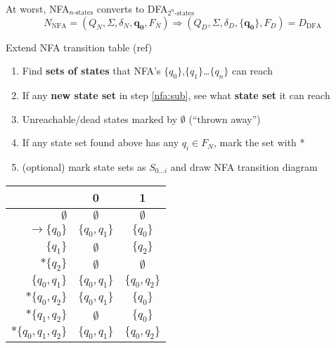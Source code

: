 At worst, NFA$_{n\text{-states}}$ converts to DFA$_{2^{n}\text{-states}}$\\
\vspace{-0.5em}
{\footnotesize
\[
  N_{\text{NFA}} = (Q_{N},\Sigma,\delta_{N},\mathbf{q_{0}},F_{N}) \Rightarrow (Q_{D},\Sigma,\delta_{D},{\mathbf{\{q_{0}\}}},F_{D}) = D_{\text{DFA}}
\]
}
{\footnotesize
\begin{minipage}{0.5\linewidth}
Extend NFA transition table (ref)
  \begin{enumerate}[align=left]
    \item\label{nfa:sub} Find \textbf{sets of states} that NFA's \(\{q_{0}\}\),\(\{q_{1}\}\)\ldots\(\{q_{n }\}\) can reach
    \item If any \textbf{new state set} in step \ref{nfa:sub}, see what \textbf{state set} it can reach
    \item Unreachable/dead states marked by \(\emptyset\)  (``thrown away'')
    \item If any state set found above has any \(q_{i} \in F_{N}\), mark the set with *
    \item (optional) mark state sets as \(S_{0\ldots i}\) and draw NFA transition diagram
  \end{enumerate}
\end{minipage}%
\begin{minipage}{0.45\linewidth}
  \centering
\begin{tabular}{r||c|c}
   & 0 & 1 \\
  \hline
  \(\emptyset\) & \(\emptyset\) & \(\emptyset\)\\
  \(\rightarrow \{q_{0}\}\) & \(\{q_{0},q_{1}\}\) & \(\{q_{0}\}\)\\
  \(\{q_{1}\}\) & \(\emptyset\) & \(\{q_{2}\}\)\\
  \(*\{q_{2}\}\) & \(\emptyset\) & \(\emptyset\)\\
  \(\{q_{0},q_{1}\}\) & \(\{q_{0},q_{1}\}\) & \(\{q_{0},q_{2}\}\)\\
  \(*\{q_{0},q_{2}\}\) & \(\{q_{0},q_{1}\}\) & \(\{q_{0}\}\)\\
  \(*\{q_{1},q_{2}\}\) & \(\emptyset\) & \(\{q_{0}\}\)\\
  \(*\{q_{0},q_{1},q_{2}\}\) & \(\{q_{0},q_{1}\}\) & \(\{q_{0},q_{2}\}\)\\
  \hline
\end{tabular}
\end{minipage}
}
